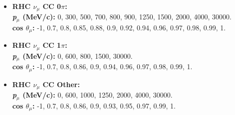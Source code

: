 \begin{itemize}
\item \textbf{RHC $\nu_{\mu}$ CC 0$\pi$:}\\
\textbf{\textit{p}$_{\mu}$ (MeV/c):} 0, 300, 500, 700, 800, 900, 1250, 1500, 2000, 4000, 30000.\\
\textbf{cos $\theta_{\mu}$:} -1, 0.7, 0.8, 0.85, 0.88, 0.9, 0.92, 0.94, 0.96, 0.97, 0.98, 0.99, 1.

\item \textbf{RHC $\nu_{\mu}$ CC 1$\pi$:}\\
\textbf{\textit{p}$_{\mu}$ (MeV/c):} 0, 600, 800, 1500, 30000.\\
\textbf{cos $\theta_{\mu}$:} -1, 0.7, 0.8, 0.86, 0.9, 0.94, 0.96, 0.97, 0.98, 0.99, 1.

\item \textbf{RHC $\nu_{\mu}$ CC Other:}\\
\textbf{\textit{p}$_{\mu}$ (MeV/c):} 0, 600, 1000, 1250, 2000, 4000, 30000.\\
\textbf{cos $\theta_{\mu}$:} -1, 0.7, 0.8, 0.86, 0.9, 0.93, 0.95, 0.97, 0.99, 1.

\end{itemize}

